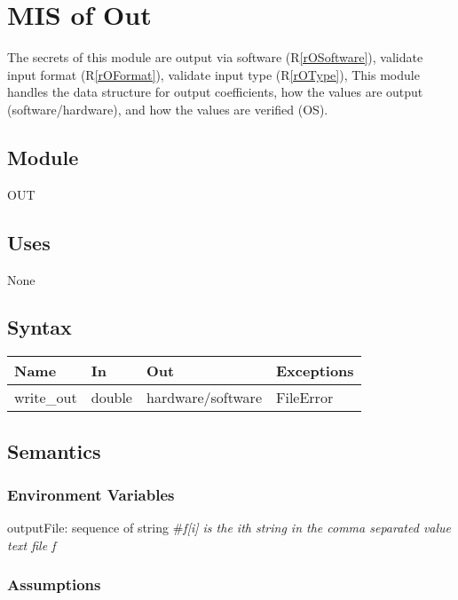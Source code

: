 \documentclass[12pt, titlepage]{article}
\newcommand{\rref}[1]{(R\ref{#1})}
\begin{document}
\section{MIS of Out} \label{sc:MIS_OUT}

The secrets of this module are
 output via software \rref{rOSoftware},
 validate input format \rref{rOFormat},
 validate input type \rref{rOType},
This module handles the data structure for output coefficients,
 how the values are output (software/hardware),
 and how the values are verified (OS).

\subsection{Module}

OUT

\subsection{Uses}

None

\subsection{Syntax}

\begin{tabular}{p{3cm} p{2cm} p{4cm} >{\raggedright\arraybackslash}p{9cm}}
\toprule
\textbf{Name} & \textbf{In} & \textbf{Out} & \textbf{Exceptions} \\
\midrule
write\_out & double & hardware/software &  FileError \\
\bottomrule
\end{tabular}

\subsection{Semantics}

\subsubsection{Environment Variables}

outputFile: sequence of string \#\textit{f[i] is the ith string in the comma separated value text file f}\\ 

\subsubsection{Assumptions}
\end{document}
